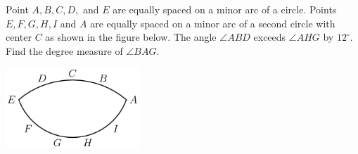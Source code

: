 Point $A,B,C,D,$ and $E$ are equally spaced on a minor arc of a circle. Points $E,F,G,H,I$ and $A$ are equally spaced on a minor arc of a second circle with center $C$ as shown in the figure below. The angle $\angle ABD$ exceeds $\angle AHG$ by $12^\circ$. Find the degree measure of $\angle BAG$.\begin{center}
\includegraphics[width = 50.400000000000006mm]{img/fig0.png}
\end{center}
